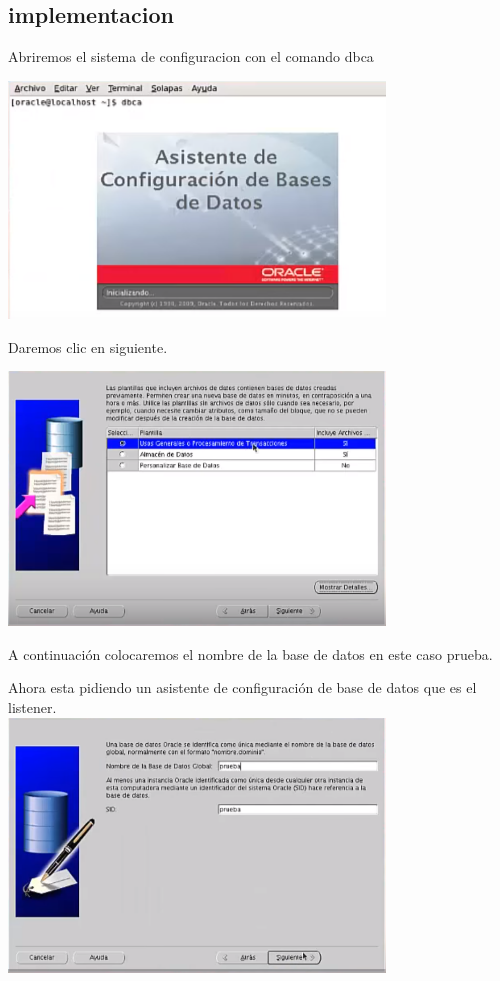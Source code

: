 \documentclass[12pt,letterpaper]{article}
\begin{document}
\subsection{implementacion}
Abriremos el sistema de configuracion con el comando dbca \\
\begin{center}
\includegraphics[width=10cm]{oraclelinux/30.png} 
\end{center}
Daremos clic en siguiente. \\
\begin{center}
\includegraphics[width=10cm]{oraclelinux/31.png}
\end{center}
A continuación colocaremos el nombre de la base de datos en este caso  prueba. \\
\begin{center}
Ahora esta pidiendo un asistente de configuración de base de datos que es el listener.\\
\includegraphics[width=10cm]{oraclelinux/32.png}
\end{center}
\end{document}

